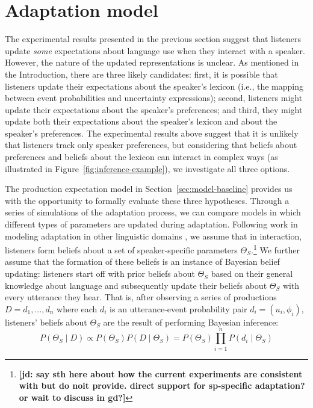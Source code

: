 \documentclass[lucida,biblatex]{sp} %
\newcommand{\jd}[1]{\textcolor{PinkyPurple}{\textbf{[jd: #1]}}}
\newcommand{\figref}[1]{Figure~\ref{#1}}
\newcommand{\sectionref}[1]{Section~\ref{#1}}
\begin{document}
% 

\section{Adaptation model}
\label{sec:model-adapt}



The experimental results presented in the previous section suggest that listeners update
\textit{some} expectations about language use when they interact with a speaker. 
However, the nature of the updated representations is unclear. As mentioned in the Introduction, there are three likely candidates:
first, it is possible that listeners update their expectations about the speaker's lexicon 
(i.e., the mapping between event probabilities and uncertainty expressions);  second, listeners
 might  update their expectations about the speaker's preferences; 
and third, they might update both their expectations about the speaker's lexicon 
and about the speaker's preferences. The experimental results above suggest that it is unlikely that listeners track only speaker preferences, but considering
that beliefs about preferences and beliefs about the lexicon can interact in complex ways (as illustrated in \figref{fig:inference-example}), we investigate all three options.

The production expectation model in \sectionref{sec:model-baseline} provides us with the opportunity to formally evaluate these three hypotheses.
Through a series of simulations of the adaptation process, we can compare models in which different types of parameters are
 updated during adaptation. Following work in modeling adaptation in other linguistic domains \citep[e.g.,][]{Kleinschmidt2012,Kleinschmidt2015}, 
we assume that in interaction, listeners form beliefs about a set of speaker-specific parameters $\Theta_S$.\footnote{\jd{say sth here about how the current experiments are consistent with but do noit provide. direct support for sp-specific adaptation? or wait to discuss in gd?}}
We further assume that the formation of these beliefs is an instance of Bayesian belief updating:
listeners start off with prior beliefs about $\Theta_S$ based on their general knowledge about 
language and subsequently update their beliefs about $\Theta_S$ with every utterance they hear. 
That is, after observing a series of productions $D={d_1, ..., d_n}$ where each $d_i$ is an 
utterance-event probability pair $d_i = (u_i, \phi_i)$, listeners' beliefs about $\Theta_S$ are the result
of performing Bayesian inference:
$$P(\Theta_S \mid D) \propto P(\Theta_S) P(D \mid \Theta_S) = P(\Theta_S) \prod_{i=1}^nP(d_i \mid \Theta_S) $$
\end{document}
